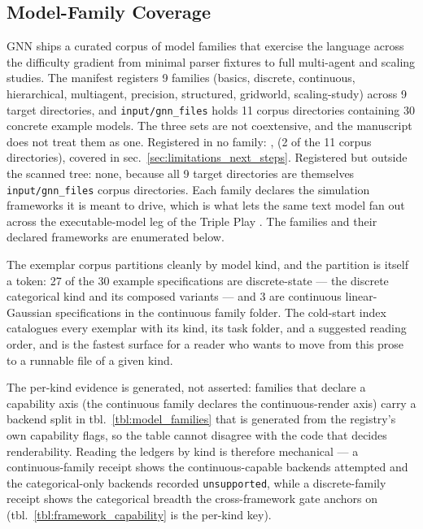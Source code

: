 \documentclass[
  english,
  9pt,
]{extarticle}
\newcounter{none} %
\begin{document}
\subsection{Model-Family Coverage}\label{model-family-coverage}

GNN ships a curated corpus of model families that exercise the language
across the difficulty gradient from minimal parser fixtures to full
multi-agent and scaling studies. The manifest registers 9 families
(basics, discrete, continuous, hierarchical, multiagent, precision,
structured, gridworld, scaling-study) across 9 target directories, and
\texttt{input/gnn\_files} holds 11 corpus directories containing 30
concrete example models. The three sets are not coextensive, and the
manuscript does not treat them as one. Registered in no family:
, 
(2 of the 11 corpus directories), covered in
sec.~\ref{sec:limitations_next_steps}. Registered but outside the
scanned tree: none, because all 9 target directories are themselves
\texttt{input/gnn\_files} corpus directories. Each family declares the
simulation frameworks it is meant to drive, which is what lets the same
text model fan out across the executable-model leg of the Triple Play
\citep{gnn2023}. The families and their declared frameworks are
enumerated below.

The exemplar corpus partitions cleanly by model kind, and the partition
is itself a token: 27 of the 30 example specifications are
discrete-state --- the discrete categorical kind and its composed
variants --- and 3 are continuous linear-Gaussian specifications in the
continuous family folder. The cold-start index
 catalogues every exemplar with its
kind, its task folder, and a suggested reading order, and is the fastest
surface for a reader who wants to move from this prose to a runnable
file of a given kind.

The per-kind evidence is generated, not asserted: families that declare
a capability axis (the continuous family declares the continuous-render
axis) carry a backend split in tbl.~\ref{tbl:model_families} that is
generated from the registry's own capability flags, so the table cannot
disagree with the code that decides renderability. Reading the ledgers
by kind is therefore mechanical --- a continuous-family receipt shows
the continuous-capable backends attempted and the categorical-only
backends recorded \texttt{unsupported}, while a discrete-family receipt
shows the categorical breadth the cross-framework gate anchors on
(tbl.~\ref{tbl:framework_capability} is the per-kind key).
\end{document}
